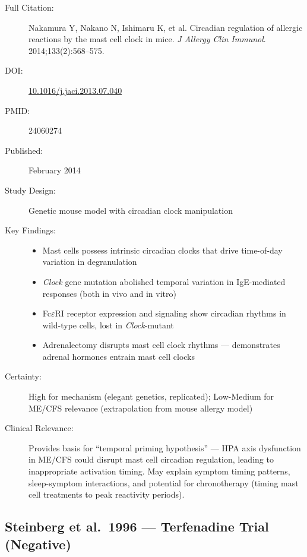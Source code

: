 \begin{description}
    \item[Full Citation:] Nakamura Y, Nakano N, Ishimaru K, et al. Circadian regulation of allergic reactions by the mast cell clock in mice. \textit{J Allergy Clin Immunol}. 2014;133(2):568--575.
    \item[DOI:] \href{https://doi.org/10.1016/j.jaci.2013.07.040}{10.1016/j.jaci.2013.07.040}
    \item[PMID:] 24060274
    \item[Published:] February 2014
    \item[Study Design:] Genetic mouse model with circadian clock manipulation
    \item[Key Findings:]
    \begin{itemize}
        \item Mast cells possess intrinsic circadian clocks that drive time-of-day variation in degranulation
        \item \textit{Clock} gene mutation abolished temporal variation in IgE-mediated responses (both in vivo and in vitro)
        \item Fc$\varepsilon$RI receptor expression and signaling show circadian rhythms in wild-type cells, lost in \textit{Clock}-mutant
        \item Adrenalectomy disrupts mast cell clock rhythms --- demonstrates adrenal hormones entrain mast cell clocks
    \end{itemize}
    \item[Certainty:] High for mechanism (elegant genetics, replicated); Low-Medium for ME/CFS relevance (extrapolation from mouse allergy model)
    \item[Clinical Relevance:] Provides basis for ``temporal priming hypothesis'' --- HPA axis dysfunction in ME/CFS could disrupt mast cell circadian regulation, leading to inappropriate activation timing. May explain symptom timing patterns, sleep-symptom interactions, and potential for chronotherapy (timing mast cell treatments to peak reactivity periods).
\end{description}

\subsection{Steinberg et al.\ 1996 --- Terfenadine Trial (Negative)}

